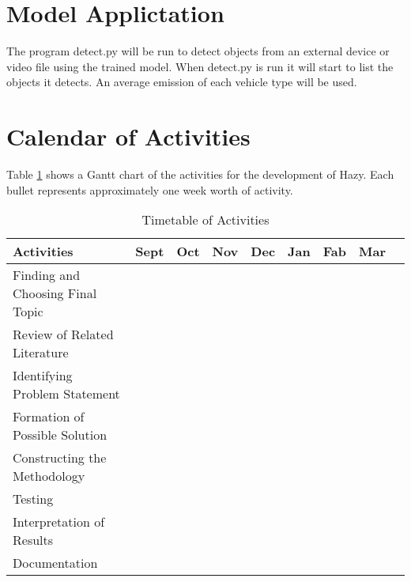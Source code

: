 \section {Model Applictation}
The program detect.py will be run to detect objects from an external device or video file using the trained model. When detect.py is run it will start to list the objects it detects. An average emission of each vehicle type will be used.



\section{Calendar of Activities}

Table \ref{tab:timetableactivities} shows a Gantt chart of the activities for the development of Hazy.  Each bullet represents approximately
one week worth of activity.

%
%
\newcommand{\weekone}{\textbullet}
\newcommand{\weektwo}{\textbullet \textbullet}
\newcommand{\weekthree}{\textbullet \textbullet \textbullet}
\newcommand{\weekfour}{\textbullet \textbullet \textbullet \textbullet}

%
%
\begin{comment}
   \newcommand{\weekone}{$\star$}
   \newcommand{\weektwo}{$\star \star$}
   \newcommand{\weekthree}{$\star \star \star$}
   \newcommand{\weekfour}{$\star \star \star \star$ }
\end{comment}



\begin{table}[ht]   %
\centering
\caption{Timetable of Activities} \vspace{0.25em}
\begin{tabular}{|p{2in}|c|c|c|c|c|c|c|c|} \hline
\centering Activities  & Sept  & Oct & Nov & Dec & Jan & Fab & Mar \\ \hline
Finding and Choosing Final Topic      & ~~~\weektwo &  &  &  &  &  &  \\ \hline
Review of Related Literature &   & \weekfour & \weekfour &  &  &  &  \\ \hline
Identifying Problem Statement     &  ~~~\weektwo &  \weekone~~~  &  & &  &  &  \\ \hline
Formation of Possible Solution    &   & ~~~\weektwo  &  \weekone~~~ &  & & &  \\ \hline
Constructing the Methodology     &   &  &   ~~~\weektwo & \weekthree ~~ & &  &  \\ \hline
Testing     &   &  &  & \weekthree ~~ & &  &  \\ \hline
Interpretation of Results     &   &  &  & \weekthree ~~ & &  &  \\ \hline
Documentation & ~~~\weektwo  & \weekfour & \weekfour &\weekone ~~& &&~~~ \\ \hline
\end{tabular}
\label{tab:timetableactivities}
\end{table}

